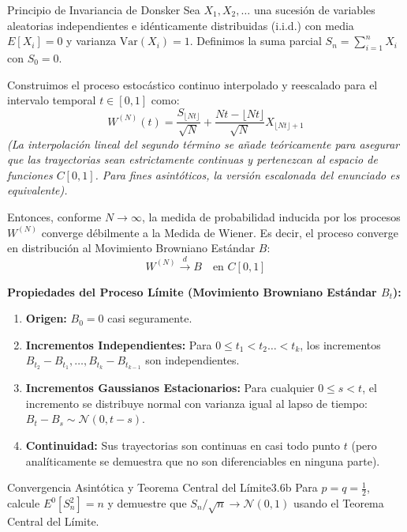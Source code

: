 \documentclass[10pt,a4paper]{article}
\begin{document}
\begin{mytheo}{Principio de Invariancia de Donsker}{}
    Sea $X_1, X_2, \dots$ una sucesión de variables aleatorias independientes e idénticamente distribuidas (i.i.d.) con media $E[X_i] = 0$ y varianza $\text{Var}(X_i) = 1$.
    Definimos la suma parcial $S_n = \sum_{i=1}^n X_i$ con $S_0 = 0$.

    Construimos el proceso estocástico continuo interpolado y reescalado para el intervalo temporal $t \in [0,1]$ como:
    \[ W^{(N)}(t) = \frac{S_{\lfloor Nt \rfloor}}{\sqrt{N}} + \frac{Nt - \lfloor Nt \rfloor}{\sqrt{N}} X_{\lfloor Nt \rfloor + 1} \]
    \textit{(La interpolación lineal del segundo término se añade teóricamente para asegurar que las trayectorias sean estrictamente continuas y pertenezcan al espacio de funciones $C[0,1]$. Para fines asintóticos, la versión escalonada del enunciado es equivalente).}

    Entonces, conforme $N \to \infty$, la medida de probabilidad inducida por los procesos $W^{(N)}$ converge débilmente a la Medida de Wiener. Es decir, el proceso converge en distribución al Movimiento Browniano Estándar $B$:
    \[ W^{(N)} \xrightarrow{d} B \quad \text{en } C[0,1] \]

    \vspace{2mm}
    \textbf{Propiedades del Proceso Límite (Movimiento Browniano Estándar $B_t$):}
    \begin{enumerate}
        \item \textbf{Origen:} $B_0 = 0$ casi seguramente.
        \item \textbf{Incrementos Independientes:} Para $0 \le t_1 < t_2 \dots < t_k$, los incrementos $B_{t_2}-B_{t_1}, \dots, B_{t_k}-B_{t_{k-1}}$ son independientes.
        \item \textbf{Incrementos Gaussianos Estacionarios:} Para cualquier $0 \le s < t$, el incremento se distribuye normal con varianza igual al lapso de tiempo: $B_t - B_s \sim \mathcal{N}(0, t-s)$.
        \item \textbf{Continuidad:} Sus trayectorias son continuas en casi todo punto $t$ (pero analíticamente se demuestra que no son diferenciables en ninguna parte).
    \end{enumerate}
\end{mytheo}

\newpage

\begin{ejercicio}{Convergencia Asintótica y Teorema Central del Límite}{3.6b}
    Para $p = q = \frac{1}{2}$, calcule $E^0[S_n^2] = n$ y demuestre que $S_n/\sqrt{n} \to \mathcal{N}(0,1)$ usando el Teorema Central del Límite.
\end{ejercicio}
\end{document}
